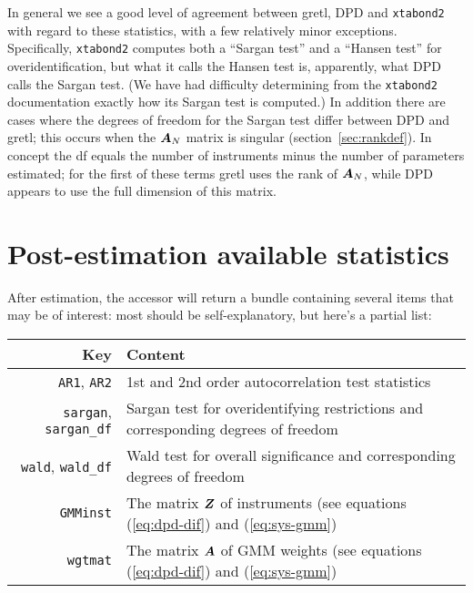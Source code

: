 In general we see a good level of agreement between gretl, DPD and
\texttt{xtabond2} with regard to these statistics, with a few
relatively minor exceptions. Specifically, \texttt{xtabond2} computes
both a ``Sargan test'' and a ``Hansen test'' for overidentification,
but what it calls the Hansen test is, apparently, what DPD calls the
Sargan test. (We have had difficulty determining from the
\texttt{xtabond2} documentation \citep{Roodman2006} exactly how its
Sargan test is computed.) In addition there are cases where the
degrees of freedom for the Sargan test differ between DPD and gretl;
this occurs when the $\boldsymbol{A}_N$ matrix is singular
(section~\ref{sec:rankdef}). In concept the df equals the number of
instruments minus the number of parameters estimated; for the first of
these terms gretl uses the rank of $\boldsymbol{A}_N$, while DPD appears to use
the full dimension of this matrix.

\section{Post-estimation available statistics}
\label{sec:dpanel-post}

After estimation, the  accessor will return a bundle
containing several items that may be of interest: most should be
self-explanatory, but here's a partial list:

\begin{center}
\begin{tabular}{rp{}}
  \hline
  \textbf{Key} & \textbf{Content} \\
  \hline
  \texttt{AR1}, \texttt{AR2} & 1st and 2nd order autocorrelation test
                               statistics \\
  \texttt{sargan}, \texttt{sargan\_df} & Sargan test for
                                         overidentifying restrictions
                                         and corresponding degrees of freedom \\
  \texttt{wald}, \texttt{wald\_df} & Wald test for
                                     overall significance
                                     and corresponding degrees of
                                     freedom \\
  \texttt{GMMinst} & The matrix $\boldsymbol{Z}$ of instruments (see equations
                     (\ref{eq:dpd-dif}) and (\ref{eq:sys-gmm}) \\
  \texttt{wgtmat} & The matrix $\boldsymbol{A}$ of GMM weights (see equations
                    (\ref{eq:dpd-dif}) and (\ref{eq:sys-gmm}) \\
  \hline
\end{tabular}
\end{center}

